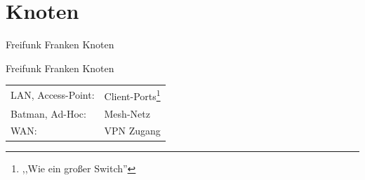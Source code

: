 \section{Knoten}
\begin{frame}{}
    \begin{center}
        Freifunk Franken Knoten
     \end{center}
\end{frame}

\begin{frame}{Freifunk Franken Knoten}
    \begin{center}
    \end{center}
    \begin{tabular}{ll}
        LAN, Access-Point: & Client-Ports\footnote{,,Wie ein großer Switch''} \\
        Batman, Ad-Hoc: & Mesh-Netz \\
        WAN: & VPN Zugang \\
    \end{tabular}
\end{frame}


